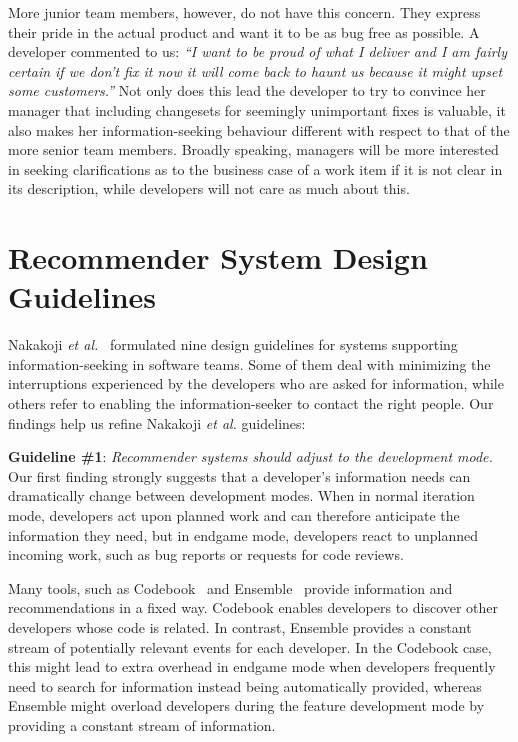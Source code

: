 More junior team members, however, do not have this concern. They express their pride in the actual product and want it to be as bug free as possible. A developer commented to us: \emph{``I want to be proud of what I deliver and I am fairly certain if we don't fix it now it will come back to haunt us because it might upset some customers.''} Not only does this lead the developer to try to convince her manager that including changesets for seemingly unimportant fixes is valuable, it also makes her information-seeking behaviour different with respect to that of the more senior team members. Broadly speaking, managers will be more interested in seeking clarifications as to the business case of a work item if it is not clear in its description, while developers will not care as much about this.

\section{Recommender System Design Guidelines}
\label{sec:sub:tools}
Nakakoji \emph{et al.}~\cite{nakakoji2010:rdc} formulated nine design guidelines for systems supporting information-seeking in software teams. Some of them deal with minimizing the interruptions experienced by the developers who are asked for information, while others refer to enabling the information-seeker to contact the right people. Our findings help us refine Nakakoji \emph{et al.} guidelines:


\textbf{Guideline \#1}: \emph{Recommender systems should adjust to the development mode.}
Our first finding strongly suggests that a developer's information needs can dramatically change between development modes. 
%
When in normal iteration mode, developers act upon planned work and can therefore anticipate the information they need, but in endgame mode, developers react to unplanned incoming work, such as bug reports or requests for code reviews. 

Many tools, such as Codebook~\cite{begel:icse:2010} and Ensemble~\cite{xiang:rsse:2008} provide information and recommendations in a fixed way. 
Codebook enables developers to discover other developers whose code is related.
In contrast,  Ensemble provides a constant stream of potentially relevant events for each developer.
In the Codebook case, this might lead to extra overhead in endgame mode when developers frequently need to search for information instead being automatically provided, whereas Ensemble might overload developers during the feature development mode by providing a constant stream of information.


